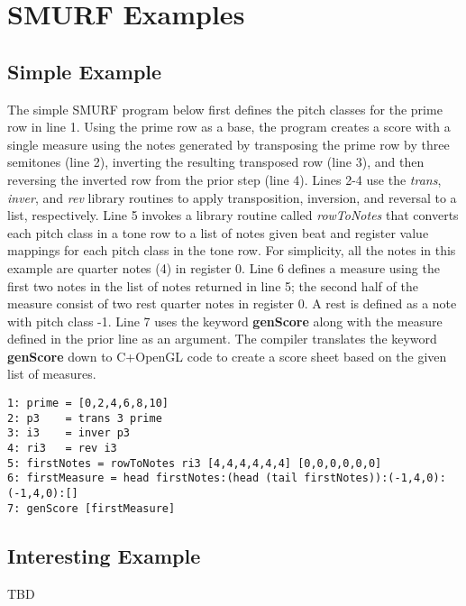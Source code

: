 \section{SMURF Examples}

\subsection{Simple Example}
The simple SMURF program below first defines the pitch classes for the prime row in line 1. 
Using the prime row as a base, the program creates a score with a single measure using the 
notes generated by transposing the prime row by three semitones (line 2), inverting the 
resulting transposed row (line 3), and then reversing the inverted row from the prior step 
(line 4). Lines 2-4 use the \emph{trans}, \emph{inver}, and \emph{rev} library routines to apply 
transposition, inversion, and reversal to a list, respectively. Line 5 invokes a library 
routine called \emph{rowToNotes} that converts each pitch class in a tone row to a list of 
notes given beat and register value mappings for each pitch class in the tone row. For 
simplicity, all the notes in this example are quarter notes (4) in register 0. Line 6 defines 
a measure using the first two notes in the list of notes returned in line 5; the second half 
of the measure consist of two rest quarter notes in register 0. A rest is defined as a note 
with pitch class -1.  Line 7 uses the keyword \textbf{genScore} along with the measure defined 
in the prior line as an argument. The compiler translates the keyword \textbf{genScore} down 
to C+OpenGL code to create a score sheet based on the given list of measures.     

\begin{verbatim}
1: prime = [0,2,4,6,8,10]
2: p3    = trans 3 prime
3: i3    = inver p3
4: ri3   = rev i3
5: firstNotes = rowToNotes ri3 [4,4,4,4,4,4] [0,0,0,0,0,0]
6: firstMeasure = head firstNotes:(head (tail firstNotes)):(-1,4,0):(-1,4,0):[]
7: genScore [firstMeasure]
\end{verbatim}

\subsection{Interesting Example}

TBD
